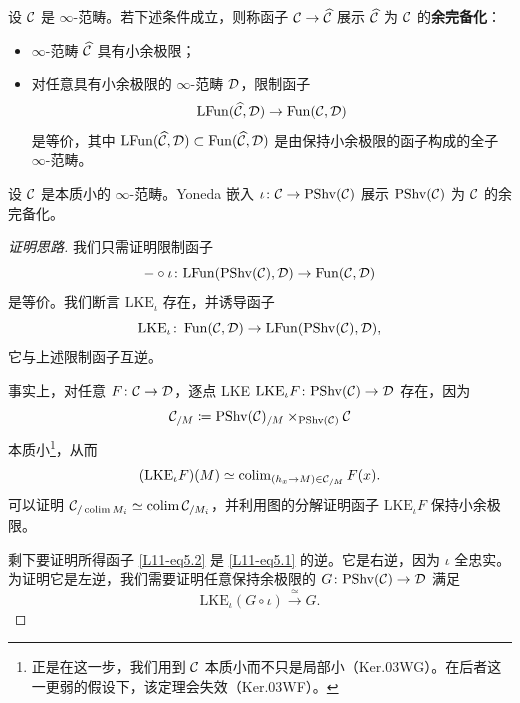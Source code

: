 \begin{definition}\label{L11-5.1}
设 $\mathcal{C}$ 是 $\infty$-范畴。若下述条件成立，则称函子 $\mathcal{C}\to\widehat{\mathcal{C}}$ 展示 $\widehat{\mathcal{C}}$ 为 $\mathcal{C}$ 的\textbf{余完备化}：
\begin{itemize}[leftmargin=2.2em,itemsep=0.1em]
\item $\infty$-范畴 $\widehat{\mathcal{C}}$ 具有小余极限；
\item 对任意具有小余极限的 $\infty$-范畴 $\mathcal{D}$，限制函子
\[
\mathrm{LFun}(\widehat{\mathcal{C}},\mathcal{D})\to\operatorname{Fun}(\mathcal{C},\mathcal{D})
\]
是等价，其中 $\mathrm{LFun}(\widehat{\mathcal{C}},\mathcal{D})\subset\operatorname{Fun}(\widehat{\mathcal{C}},\mathcal{D})$ 是由保持小余极限的函子构成的全子 $\infty$-范畴。
\end{itemize}
\end{definition}

\begin{theorem}[Ker.04BE]\label{L11-5.2}
设 $\mathcal{C}$ 是本质小的 $\infty$-范畴。Yoneda 嵌入 $\iota\colon\mathcal{C}\to\mathrm{PShv}(\mathcal{C})$ 展示 $\mathrm{PShv}(\mathcal{C})$ 为 $\mathcal{C}$ 的余完备化。
\end{theorem}

\begin{proof}[证明思路]
我们只需证明限制函子
\begin{equation}\label{L11-eq5.1}
-\circ\iota\colon\mathrm{LFun}(\mathrm{PShv}(\mathcal{C}),\mathcal{D})\to\operatorname{Fun}(\mathcal{C},\mathcal{D})
\end{equation}
是等价。我们断言 $\mathrm{LKE}_\iota$ 存在，并诱导函子
\begin{equation}\label{L11-eq5.2}
\mathrm{LKE}_\iota\colon\operatorname{Fun}(\mathcal{C},\mathcal{D})\to\mathrm{LFun}(\mathrm{PShv}(\mathcal{C}),\mathcal{D}),
\end{equation}
它与上述限制函子互逆。

事实上，对任意 $F\colon\mathcal{C}\to\mathcal{D}$，逐点 LKE $\mathrm{LKE}_\iota F\colon\mathrm{PShv}(\mathcal{C})\to\mathcal{D}$ 存在，因为
\begin{equation}\label{L11-eq5.3}
\mathcal{C}_{/M}\coloneqq\mathrm{PShv}(\mathcal{C})_{/M}\times_{\mathrm{PShv}(\mathcal{C})}\mathcal{C}
\end{equation}
本质小\footnote{正是在这一步，我们用到 $\mathcal{C}$ 本质小而不只是局部小（Ker.03WG）。在后者这一更弱的假设下，该定理会失效（Ker.03WF）。}，从而
\[
(\mathrm{LKE}_\iota F)(M)\simeq\operatorname{colim}_{(h_x\to M)\in\mathcal{C}_{/M}}F(x).
\]
可以证明 $\mathcal{C}_{/\operatorname{colim} M_i}\simeq\operatorname{colim}\mathcal{C}_{/M_i}$，并利用图的分解证明函子 $\mathrm{LKE}_\iota F$ 保持小余极限。

剩下要证明所得函子 \eqref{L11-eq5.2} 是 \eqref{L11-eq5.1} 的逆。它是右逆，因为 $\iota$ 全忠实。为证明它是左逆，我们需要证明任意保持余极限的 $G\colon\mathrm{PShv}(\mathcal{C})\to\mathcal{D}$ 满足
\begin{equation}\label{L11-eq5.4}
\mathrm{LKE}_\iota(G\circ\iota)\xrightarrow{\ \simeq\ }G.
\end{equation}
\end{proof}

